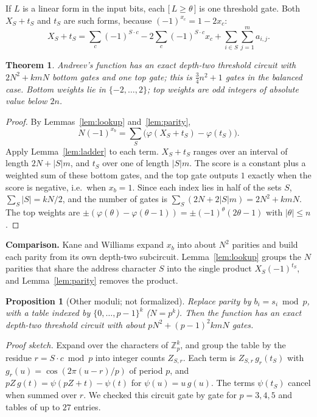 \documentclass[11pt,letterpaper]{article}
\newtheorem{theorem}{Theorem}
\newtheorem{proposition}{Proposition}
\newcommand{\ind}[1]{\bigl[\,#1\,\bigr]}
\newcommand{\smalltitle}[1]{\textbf{\color{ink}#1}\quad}
\begin{document}
If $L$ is a linear form in the input bits, each $\ind{L\ge\theta}$ is one
threshold gate. Both $X_S+t_S$ and $t_S$ are such forms, because
$(-1)^{x_c}=1-2x_c$:
\begin{equation}\label{eq:form}
X_S+t_S=\sum_c(-1)^{S\cdot c}-2\sum_c(-1)^{S\cdot c}x_c+\sum_{i\in S}\sum_{j=1}^m a_{i,j}.
\end{equation}

\begin{theorem}\label{thm:exact}
Andreev's function has an exact depth-two threshold circuit with
$2N^2+kmN$ bottom gates and one top gate; this is $\tfrac34n^2+1$ gates in
the balanced case. Bottom weights lie in $\{-2,\dots,2\}$; top weights are
odd integers of absolute value below $2n$.
\end{theorem}
\begin{proof}
By Lemmas~\ref{lem:lookup} and~\ref{lem:parity},
\[
N(-1)^{x_b}=\sum_S\bigl(\varphi(X_S+t_S)-\varphi(t_S)\bigr).
\]
Apply Lemma~\ref{lem:ladder} to each term. $X_S+t_S$ ranges over an interval
of length $2N+|S|m$, and $t_S$ over one of length $|S|m$. The score is a
constant plus a weighted sum of these bottom gates, and the top gate outputs
$1$ exactly when the score is negative, i.e.\ when $x_b=1$. Since each index
lies in half of the sets $S$, $\sum_S|S|=kN/2$, and the number of gates is
$\sum_S(2N+2|S|m)=2N^2+kmN$. The top weights are
$\pm(\varphi(\theta)-\varphi(\theta-1))=\pm(-1)^\theta(2\theta-1)$ with
$|\theta|\le n$.
\end{proof}

\smalltitle{Comparison.}
Kane and Williams expand $x_b$ into about $N^2$ parities and build each
parity from its own depth-two subcircuit. Lemma~\ref{lem:lookup} groups the
$N$ parities that share the address character $S$ into the single product
$X_S(-1)^{t_S}$, and Lemma~\ref{lem:parity} removes the product.

\begin{keybox}
\begin{proposition}[Other moduli; not formalized]\label{prop:modp}
Replace parity by $b_i=s_i\bmod p$, with a table indexed by
$\{0,\dots,p-1\}^k$ ($N=p^k$). Then the function has an exact depth-two
threshold circuit with about $pN^2+(p-1)^2kmN$ gates.
\end{proposition}
\emph{Proof sketch.} Expand over the characters of $\mathbb Z_p^k$, and
group the table by the residue $r=S\cdot c\bmod p$ into integer counts
$Z_{S,r}$. Each term is $Z_{S,r}\,g_r(t_S)$ with $g_r(u)=\cos(2\pi(u-r)/p)$
of period $p$, and $pZ\,g(t)=\psi(pZ+t)-\psi(t)$ for $\psi(u)=u\,g(u)$. The
terms $\psi(t_S)$ cancel when summed over $r$. We checked this circuit gate
by gate for $p=3,4,5$ and tables of up to $27$ entries.
\end{keybox}
\end{document}
